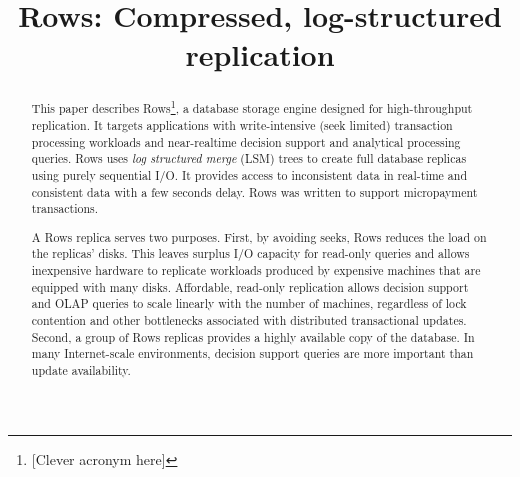 \documentclass{sig-alternate-sigmod08}
\newcommand{\rows}{Rows\xspace}
\begin{document}
%

\title{{\ttlit \rows}: Compressed, log-structured replication}
%
%
\author{}
\maketitle
\begin{abstract}
This paper describes \rows\footnote{[Clever acronym here]}, a database
storage engine designed for high-throughput replication.  It targets
applications with write-intensive (seek limited) transaction
processing workloads and near-realtime decision support and analytical
processing queries.  \rows uses {\em log structured merge} (LSM) trees
to create full database replicas using purely sequential I/O.  It
provides access to inconsistent data in real-time and consistent data
with a few seconds delay.  \rows was written to support micropayment
transactions.  

A \rows replica serves two purposes.  First, by avoiding seeks, \rows
reduces the load on the replicas' disks.  This leaves surplus I/O capacity
for read-only queries and allows inexpensive hardware to replicate
workloads produced by expensive machines that are equipped with many disks.
Affordable, read-only replication allows decision support and OLAP queries to
scale linearly with the number of machines, regardless of lock
contention and other bottlenecks associated with distributed
transactional updates.  Second, a group of \rows replicas provides a highly
available copy of the database.  In many Internet-scale environments,
decision support queries are more important than update availability.



\end{abstract}
\end{document}
